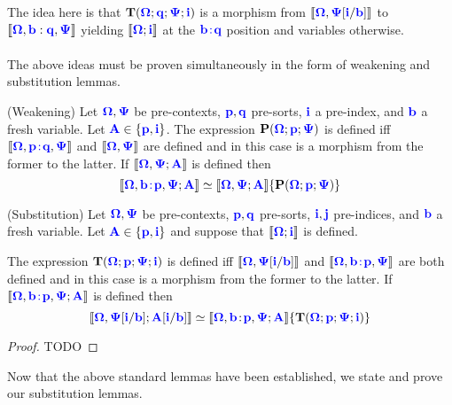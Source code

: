 \documentclass[sigplan,10pt,review,anonymous]{acmart}
\newcommand{\blum}[1]{\mathbf{\color{blue}{#1}}}
\newcommand{\sem}[1]{\llbracket #1 \rrbracket}
\newcommand{\mbf}[1]{\mathbf{#1}}
\begin{document}
The idea here is that $\mbf{T}(\blum{\Omega} ; \blum{q} ; \blum{\Psi} ; \blum{i})$ is a morphism from $\sem{\blum{\Omega},\blum{\Psi}[\blum{i}/\blum{b}]}$ to $\sem{\blum{\Omega}, \blum{b} : \blum{q}, \blum{\Psi}}$ yielding $\sem{\blum{\Omega} ; \blum{i}}$ at the $\blum{b \! : \! \blum{q}}$ position and variables otherwise.\\~\\
The above ideas must be proven simultaneously in the form of weakening and substitution lemmas.

\begin{lemma}
(Weakening) Let $\blum{\Omega},\blum{\Psi}$ be pre-contexts, $\blum{p},\blum{q}$ pre-sorts, $\blum{i}$ a pre-index, and $\blum{b}$ a fresh variable. Let $\blum{A} \in \{ \blum{p}, \blum{i} \}$. The expression $\mbf{P}(\blum{\Omega} ; \blum{p} ; \blum{\Psi})$ is defined iff $\sem{\blum{\Omega}, \blum{p \! : \! q}, \blum{\Psi}}$ and $\sem{\blum{\Omega}, \blum{\Psi}}$ are defined and in this case is a morphism from the former to the latter. If $\sem{\blum{\Omega},\blum{\Psi} ; \blum{A}}$ is defined then 
$$\sem{\blum{\Omega}, \blum{b \! : \! p}, \blum{\Psi} ; \blum{A}} \simeq \sem{\blum{\Omega} , \blum{\Psi} ; \blum{A}} \{ \mbf{P}(\blum{\Omega}; \blum{p} ; \blum{\Psi}) \}$$
\end{lemma}

\begin{lemma}
\label{lemma:indsortsub}
(Substitution) Let $\blum{\Omega},\blum{\Psi}$ be pre-contexts, $\blum{p},\blum{q}$ pre-sorts, $\blum{i}, \blum{j}$ pre-indices, and $\blum{b}$ a fresh variable. Let $\blum{A} \in \{ \blum{p}, \blum{i} \}$ and suppose that $\sem{\blum{\Omega} ; \blum{i}}$ is defined. 

The expression $\mbf{T}(\blum{\Omega};\blum{p};\blum{\Psi};\blum{i})$ is defined iff $\sem{\blum{\Omega}, \blum{\Psi}[\blum{i}/\blum{b}]}$ and $\sem{\blum{\Omega} , \blum{b \! : \! p}, \blum{\Psi}}$ are both defined and in this case is a morphism from the former to the latter. If $\sem{\blum{\Omega},\blum{b \! : \! p},\blum{\Psi} ; \blum{A}}$ is defined then 
$$\sem{\blum{\Omega},\blum{\Psi}[\blum{i}/\blum{b}]; \blum{A}[\blum{i}/\blum{b}]} \simeq \sem{\blum{\Omega},\blum{b} \! : \! \blum{p},\blum{\Psi};\blum{A}} \{ \mbf{T}(\blum{\Omega} ; \blum{p} ; \blum{\Psi} ; \blum{i}) \}$$
\end{lemma}

\begin{proof}
TODO
\end{proof}

Now that the above standard lemmas have been established, we state and prove our substitution lemmas.
\end{document}
